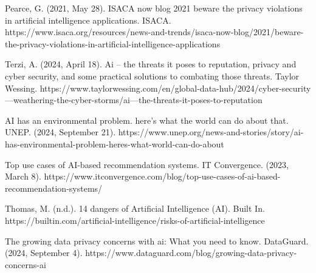 \documentclass[licencjacka,en]{pracamgr}
\begin{document}
\begin{thebibliography}{99}
Pearce, G. (2021, May 28). ISACA now blog 2021 beware the privacy violations in artificial intelligence applications. ISACA. https://www.isaca.org/resources/news-and-trends/isaca-now-blog/2021/beware-the-privacy-violations-in-artificial-intelligence-applications

Terzi, A. (2024, April 18). Ai – the threats it poses to reputation, privacy and cyber security, and some practical solutions to combating those threats. Taylor Wessing. https://www.taylorwessing.com/en/global-data-hub/2024/cyber-security---weathering-the-cyber-storms/ai---the-threats-it-poses-to-reputation

AI has an environmental problem. here’s what the world can do about that. UNEP. (2024, September 21). https://www.unep.org/news-and-stories/story/ai-has-environmental-problem-heres-what-world-can-do-about

Top use cases of AI-based recommendation systems. IT Convergence. (2023, March 8). https://www.itconvergence.com/blog/top-use-cases-of-ai-based-recommendation-systems/

Thomas, M. (n.d.). 14 dangers of Artificial Intelligence (AI). Built In. https://builtin.com/artificial-intelligence/risks-of-artificial-intelligence

The growing data privacy concerns with ai: What you need to know. DataGuard. (2024, September 4). https://www.dataguard.com/blog/growing-data-privacy-concerns-ai


\end{thebibliography}
\end{document}
